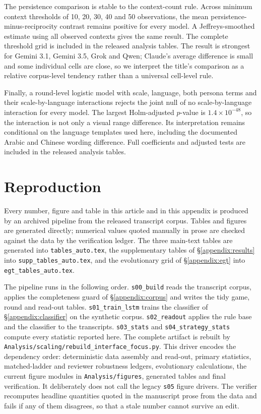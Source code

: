 \documentclass[openacc]{rsproca_new}
\begin{document}
The persistence comparison is stable to the context-count rule. Across minimum
context thresholds of 10, 20, 30, 40 and 50 observations, the mean
persistence-minus-reciprocity contrast remains positive for every model. A
Jeffreys-smoothed estimate using all observed contexts gives the same result.
The complete threshold grid is included in the released analysis tables. The result is strongest for
Gemini 3.1, Gemini 3.5, Grok and Qwen; Claude's average difference is small and
some individual cells are close, so we interpret the title's comparison as a
relative corpus-level tendency rather than a universal cell-level rule.

Finally, a round-level logistic model with scale, language, both persona terms
and their scale-by-language interactions rejects the joint null of no
scale-by-language interaction for every model. The largest Holm-adjusted
$p$-value is $1.4\times10^{-48}$, so the interaction is not only a visual
range difference. Its interpretation remains conditional on the language
templates used here, including the documented Arabic and Chinese wording
difference. Full coefficients and adjusted tests are included in the released
analysis tables.



\section{Reproduction}\label{appendix:repro}

Every number, figure and table in this article and in this appendix is produced
by an archived pipeline from the released transcript corpus. Tables and figures
are generated directly; numerical values quoted manually in prose are checked
against the data by the verification ledger. The three main-text tables are
generated into \texttt{tables\_auto.tex}, the supplementary tables of
\S\ref{appendix:results} into \texttt{supp\_tables\_auto.tex}, and the
evolutionary grid of \S\ref{appendix:egt} into \texttt{egt\_tables\_auto.tex}.

The pipeline runs in the following order. \texttt{s00\_build} reads the
transcript corpus, applies the completeness guard of
\S\ref{appendix:corpus} and writes the tidy game, round and read-out tables.
\texttt{s01\_train\_lstm} trains the classifier of \S\ref{appendix:classifier}
on the synthetic corpus. \texttt{s02\_readout} applies the rule base and the
classifier to the transcripts. \texttt{s03\_stats} and
\texttt{s04\_strategy\_stats} compute every statistic reported here.
The complete artifact is rebuilt by
\texttt{Analysis/scaling/rebuild\_interface\_focus.py}. This driver encodes the
dependency order: deterministic data assembly and read-out, primary statistics,
matched-ladder and reviewer robustness ledgers, evolutionary calculations, the
current figure modules in \texttt{Analysis/figures}, generated tables and final
verification. It deliberately does not call the legacy \texttt{s05} figure
drivers. The verifier recomputes headline quantities quoted in the manuscript
prose from the data and fails if any of them disagrees, so that a stale number
cannot survive an edit.
\end{document}
